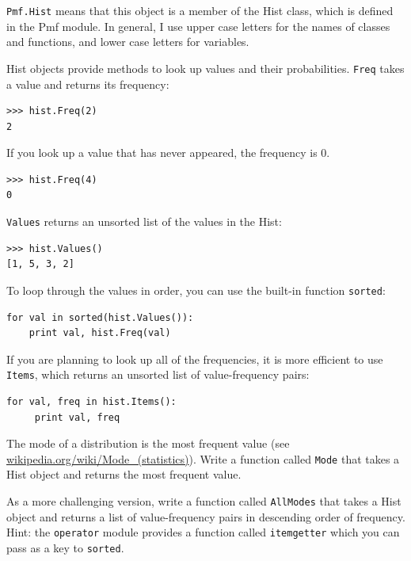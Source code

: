 \documentclass[12pt]{book}
\begin{document}
{\tt Pmf.Hist} means that this object is a member of the Hist class,
which is defined in the Pmf module.  In general, I use upper case
letters for the names of classes and functions, and lower case letters
for variables.

Hist objects provide methods to look up values and their
probabilities.  {\tt Freq} takes a value and returns its frequency:

\begin{verbatim}
>>> hist.Freq(2)
2
\end{verbatim}

If you look up a value that has never appeared, the frequency is 0.

\begin{verbatim}
>>> hist.Freq(4)
0
\end{verbatim}

{\tt Values} returns an unsorted list of the values in the Hist:

\begin{verbatim}
>>> hist.Values()
[1, 5, 3, 2]
\end{verbatim}

To loop through the values in order, you can use the built-in function
{\tt sorted}:

\begin{verbatim}
for val in sorted(hist.Values()):
    print val, hist.Freq(val)
\end{verbatim}

If you are planning to look up all of the frequencies, it is more
efficient to use {\tt Items}, which returns an unsorted list of
value-frequency pairs:

\begin{verbatim}
for val, freq in hist.Items():
     print val, freq
\end{verbatim}

\begin{exercise}
The mode of a distribution is the most frequent value (see
\url{wikipedia.org/wiki/Mode_(statistics)}).  Write a function called
    {\tt Mode} that takes a Hist object and returns the most frequent
    value.


As a more challenging version, write a function called {\tt AllModes}
that takes a Hist object and returns a list of value-frequency
pairs in descending order of frequency.  Hint: the {\tt operator}
module provides a function called {\tt itemgetter} which you can
pass as a key to {\tt sorted}.

\end{exercise}
\end{document}
